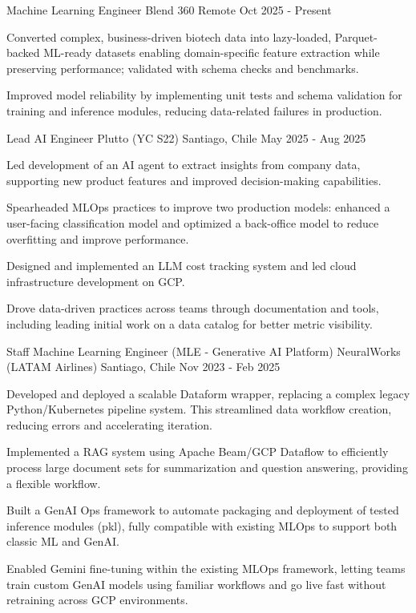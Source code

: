 \cventry
{Machine Learning Engineer}
{Blend 360}
{Remote}
{Oct 2025 - Present}
{
  \begin{cvitems}
    \item Converted complex, business-driven biotech data into lazy-loaded, Parquet-backed ML-ready datasets enabling domain-specific feature extraction while preserving performance; validated with schema checks and benchmarks.
    \item Improved model reliability by implementing unit tests and schema validation for training and inference modules, reducing data-related failures in production.
  \end{cvitems}
}
\cventry
{Lead AI Engineer}
{Plutto (YC S22)}
{Santiago, Chile}
{May 2025 - Aug 2025}
{
  \begin{cvitems}
    \item Led development of an AI agent to extract insights from company data, supporting new product features and improved decision-making capabilities.
    \item Spearheaded MLOps practices to improve two production models: enhanced a user-facing classification model and optimized a back-office model to reduce overfitting and improve performance.
    \item Designed and implemented an LLM cost tracking system and led cloud infrastructure development on GCP.
    \item Drove data-driven practices across teams through documentation and tools, including leading initial work on a data catalog for better metric visibility.
  \end{cvitems}
}

\cventry
{Staff Machine Learning Engineer (MLE - Generative AI Platform)}
{NeuralWorks (LATAM Airlines)}
{Santiago, Chile}
{Nov 2023 - Feb 2025}
{
  \begin{cvitems}
    \item Developed and deployed a scalable Dataform wrapper, replacing a complex legacy Python/Kubernetes pipeline system. This streamlined data workflow creation, reducing errors and accelerating iteration.
    \item Implemented a RAG system using Apache Beam/GCP Dataflow to efficiently process large document sets for summarization and question answering, providing a flexible workflow.
    \item Built a GenAI Ops framework to automate packaging and deployment of tested inference modules (pkl), fully compatible with existing MLOps to support both classic ML and GenAI.
    \item Enabled Gemini fine-tuning within the existing MLOps framework, letting teams train custom GenAI models using familiar workflows and go live fast without retraining across GCP environments.
  \end{cvitems}
}

